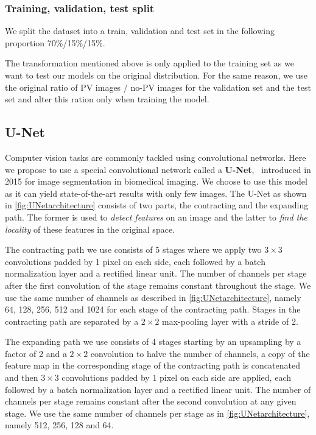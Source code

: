 \documentclass[10pt,conference]{IEEEtran}
\begin{document}
\subsubsection{Training, validation, test split}
We split the dataset into a train, validation and test set in the following proportion 70\%/15\%/15\%.

The transformation mentioned above is only applied to the training set as we want to test our models on the original distribution. For the same reason, we use the original ratio of PV images / no-PV images for the validation set and the test set and alter this ration only when training the model.

\subsection{U-Net}
Computer vision tasks are commonly tackled using convolutional networks. 
Here we propose to use a special convolutional network called a \textbf{U-Net},~\cite{ronneberger2015unet}
introduced in 2015 for image segmentation in biomedical imaging.
We choose to use this model as it can yield state-of-the-art results with only few images.
The U-Net as shown in \autoref{fig:UNetarchitecture} consists of two parts,
the contracting and the expanding path.
The former is used to \textit{detect features} on an image
and the latter to \textit{find the locality} of these features in the original space.

The contracting path we use consists of 5 stages where we apply two $3 \times 3$ convolutions padded by 1 pixel on each side,
each followed by a batch normalization layer and a rectified linear unit.
The number of channels per stage after the first convolution of the stage remains constant throughout the stage.
We use the same number of channels as described in \autoref{fig:UNetarchitecture}, namely 64, 128, 256, 512 and 1024 for each stage of the contracting path. 
Stages in the contracting path are separated by a $2 \times 2$ max-pooling layer with a stride of 2. 

The expanding path we use consists of 4 stages starting by an upsampling by a factor of 2 and a $2 \times 2$ convolution to halve the number of channels,
a copy of the feature map in the corresponding stage of the contracting path is concatenated and then $3 \times 3$ convolutions padded by 1 pixel on each side are applied,
each followed by a batch normalization layer and a rectified linear unit.
The number of channels per stage remains constant after the second convolution at any given stage.
We use the same number of channels per stage as in \autoref{fig:UNetarchitecture}, namely 512, 256, 128 and 64.
\end{document}

